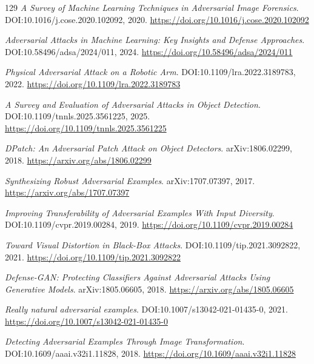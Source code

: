 \documentclass[11pt,a4paper]{article}
\begin{document}
\begin{thebibliography}{129}
\newblock \emph{A Survey of Machine Learning Techniques in Adversarial Image Forensics}.
\newblock DOI:10.1016/j.cose.2020.102092, 2020.
\newblock \url{https://doi.org/10.1016/j.cose.2020.102092}

\newblock \emph{Adversarial Attacks in Machine Learning: Key Insights and Defense Approaches}.
\newblock DOI:10.58496/adsa/2024/011, 2024.
\newblock \url{https://doi.org/10.58496/adsa/2024/011}

\newblock \emph{Physical Adversarial Attack on a Robotic Arm}.
\newblock DOI:10.1109/lra.2022.3189783, 2022.
\newblock \url{https://doi.org/10.1109/lra.2022.3189783}

\newblock \emph{A Survey and Evaluation of Adversarial Attacks in Object Detection}.
\newblock DOI:10.1109/tnnls.2025.3561225, 2025.
\newblock \url{https://doi.org/10.1109/tnnls.2025.3561225}

\newblock \emph{DPatch: An Adversarial Patch Attack on Object Detectors}.
\newblock arXiv:1806.02299, 2018.
\newblock \url{https://arxiv.org/abs/1806.02299}

\newblock \emph{Synthesizing Robust Adversarial Examples}.
\newblock arXiv:1707.07397, 2017.
\newblock \url{https://arxiv.org/abs/1707.07397}

\newblock \emph{Improving Transferability of Adversarial Examples With Input Diversity}.
\newblock DOI:10.1109/cvpr.2019.00284, 2019.
\newblock \url{https://doi.org/10.1109/cvpr.2019.00284}

\newblock \emph{Toward Visual Distortion in Black-Box Attacks}.
\newblock DOI:10.1109/tip.2021.3092822, 2021.
\newblock \url{https://doi.org/10.1109/tip.2021.3092822}

\newblock \emph{Defense-GAN: Protecting Classifiers Against Adversarial Attacks Using Generative Models}.
\newblock arXiv:1805.06605, 2018.
\newblock \url{https://arxiv.org/abs/1805.06605}

\newblock \emph{Really natural adversarial examples}.
\newblock DOI:10.1007/s13042-021-01435-0, 2021.
\newblock \url{https://doi.org/10.1007/s13042-021-01435-0}

\newblock \emph{Detecting Adversarial Examples Through Image Transformation}.
\newblock DOI:10.1609/aaai.v32i1.11828, 2018.
\newblock \url{https://doi.org/10.1609/aaai.v32i1.11828}


\end{thebibliography}
\end{document}
